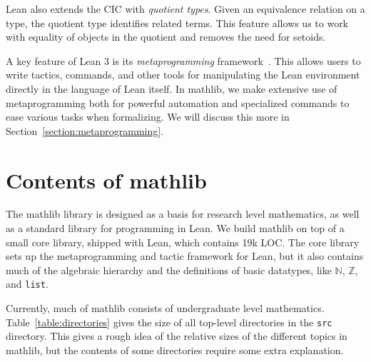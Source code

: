 \documentclass[sigplan]{acmart}\settopmatter{}
\newcommand{\mathlib}{\textsf{mathlib}\xspace}
\newcommand{\corelib}{\textsf{core} library\xspace}
\begin{document}
Lean also extends the CIC with \emph{quotient types}.
Given an equivalence relation on a type, the quotient type identifies related terms.
This feature allows us to work with equality of objects in the quotient
and removes the need for setoids.

A key feature of Lean 3 is its \emph{metaprogramming} framework~\cite{EURAM17}.
This allows users to write tactics, commands, and other tools for manipulating the Lean environment directly in the language of Lean itself.
In \mathlib, we make extensive use of metaprogramming both for powerful automation and specialized commands to ease various tasks when formalizing.
We will discuss this more in Section~\ref{section:metaprogramming}.

\section{Contents of \mathlib}
\label{section:contents}

The \mathlib library is designed as a basis for research level mathematics, as well as a standard library for programming in Lean.
We build \mathlib on top of a small \corelib, shipped with Lean, which contains 19k LOC.
The \corelib sets up the meta\-programming and tactic framework for Lean, but it also contains much of the algebraic hierarchy and the definitions of basic datatypes, like $\mathbb{N}$, $\mathbb{Z}$, and \lstinline{list}.

Currently, much of \mathlib consists of undergraduate level mathematics.
Table~\ref{table:directories} gives the size of all top-level directories in the \texttt{src} directory.
This gives a rough idea of the relative sizes of the different topics in \mathlib, but the contents of some directories require some extra explanation.
\end{document}
